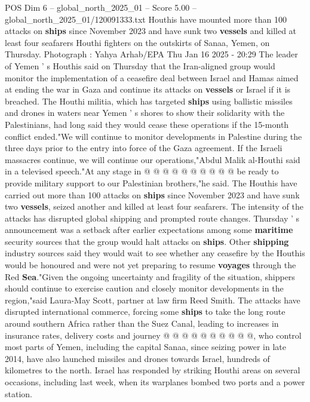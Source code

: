\begin{textsample}{POS Dim 6 – global\_north\_2025\_01 – Score 5.00 – global\_north\_2025\_01/120091333.txt}  \label{ex:f6_pos_347}
Houthis have mounted more than 100 attacks on \textbf{ships} since November 2023 and have sunk two \textbf{vessels} and killed at least four seafarers Houthi fighters on the outskirts of Sanaa, Yemen, on Thursday.
Photograph : Yahya Arhab/EPA Thu Jan 16 2025 - 20:29 The leader of Yemen ' s Houthis said on Thursday that the Iran-aligned group would monitor the implementation of a ceasefire deal between Israel and Hamas aimed at ending the war in Gaza and continue its attacks on \textbf{vessels} or Israel if it is breached.
The Houthi militia, which has targeted \textbf{ships} using ballistic missiles and drones in waters near Yemen ' s shores to show their solidarity with the Palestinians, had long said they would cease these operations if the 15-month conflict ended."We will continue to monitor developments in Palestine during the three days prior to the entry into force of the Gaza agreement.
If the Israeli massacres continue, we will continue our operations,"Abdul Malik al-Houthi said in a televised speech."At any stage in @ @ @ @ @ @ @ @ @ @ be ready to provide military support to our Palestinian brothers,"he said.
The Houthis have carried out more than 100 attacks on \textbf{ships} since November 2023 and have sunk two \textbf{vessels}, seized another and killed at least four seafarers.
The intensity of the attacks has disrupted global shipping and prompted route changes.
Thursday ' s announcement was a setback after earlier expectations among some \textbf{maritime} security sources that the group would halt attacks on \textbf{ships}.
Other \textbf{shipping} industry sources said they would wait to see whether any ceasefire by the Houthis would be honoured and were not yet preparing to resume \textbf{voyages} through the Red \textbf{Sea}."Given the ongoing uncertainty and fragility of the situation, shippers should continue to exercise caution and closely monitor developments in the region,"said Laura-May Scott, partner at law firm Reed Smith.
The attacks have disrupted international commerce, forcing some \textbf{ships} to take the long route around southern Africa rather than the Suez Canal, leading to increases in insurance rates, delivery costs and journey @ @ @ @ @ @ @ @ @ @, who control most parts of Yemen, including the capital Sanaa, since seizing power in late 2014, have also launched missiles and drones towards Israel, hundreds of kilometres to the north.
Israel has responded by striking Houthi areas on several occasions, including last week, when its warplanes bombed two ports and a power station.

\end{textsample}
